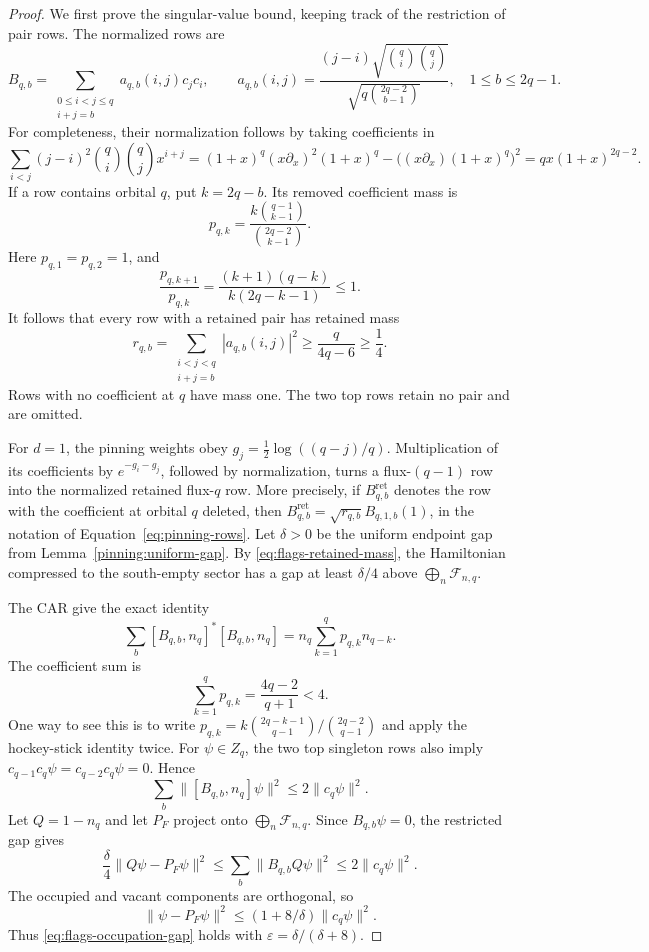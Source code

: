 \begin{proof}
We first prove the singular-value bound, keeping track of the restriction
of pair rows.  The normalized rows are
\[
 B_{q,b}=\sum_{\substack{0\leq i<j\leq q\\i+j=b}}
 a_{q,b}(i,j)c_jc_i,\qquad
 a_{q,b}(i,j)=
 \frac{(j-i)\sqrt{\binom qi\binom qj}}
 {\sqrt{q\binom{2q-2}{b-1}}},\quad 1\leq b\leq2q-1.
\]
For completeness, their normalization follows by taking coefficients in
\[
 \sum_{i<j}(j-i)^2\binom qi\binom qj x^{i+j}
 =(1+x)^q(x\partial_x)^2(1+x)^q
  -\bigl((x\partial_x)(1+x)^q\bigr)^2
 =qx(1+x)^{2q-2}.
\]
If a row contains orbital $q$, put $k=2q-b$.  Its removed coefficient
mass is
\[
 p_{q,k}=\frac{k\binom{q-1}{k-1}}{\binom{2q-2}{k-1}}.
\]
Here $p_{q,1}=p_{q,2}=1$, and
\[
 \frac{p_{q,k+1}}{p_{q,k}}
 =\frac{(k+1)(q-k)}{k(2q-k-1)}\leq1.
\]
It follows that every row with a retained pair has retained mass
\begin{equation}
 r_{q,b}=\sum_{\substack{i<j<q\\i+j=b}}|a_{q,b}(i,j)|^2
 \geq\frac{q}{4q-6}\geq\frac14.
 \label{eq:flags-retained-mass}
\end{equation}
Rows with no coefficient at $q$ have mass one.  The two top rows retain
no pair and are omitted.

For $d=1$, the pinning weights obey
$g_j=\tfrac12\log((q-j)/q)$.  Multiplication of its coefficients by
$e^{-g_i-g_j}$, followed by normalization, turns a flux-$(q-1)$ row into
the normalized retained flux-$q$ row.  More precisely, if
$B_{q,b}^{\mathrm{ret}}$ denotes the row with the coefficient at orbital
$q$ deleted, then
$B_{q,b}^{\mathrm{ret}}=\sqrt{r_{q,b}}B_{q,1,b}(1)$, in the notation
of Equation~\eqref{eq:pinning-rows}.  Let $\delta>0$ be the uniform
endpoint gap from Lemma~\ref{pinning:uniform-gap}.  By
\eqref{eq:flags-retained-mass}, the Hamiltonian compressed to the
south-empty sector has a gap at least $\delta/4$ above
$\bigoplus_n\mathcal F_{n,q}$.

The CAR give the exact identity
\[
 \sum_b[B_{q,b},n_q]^*[B_{q,b},n_q]
 =n_q\sum_{k=1}^{q}p_{q,k}n_{q-k}.
\]
The coefficient sum is
\[
 \sum_{k=1}^{q}p_{q,k}=\frac{4q-2}{q+1}<4.
\]
One way to see this is to write
$p_{q,k}=k\binom{2q-k-1}{q-1}/\binom{2q-2}{q-1}$ and apply the
hockey-stick identity twice.  For $\psi\in Z_q$, the two top singleton
rows also imply $c_{q-1}c_q\psi=c_{q-2}c_q\psi=0$.  Hence
\begin{equation}
 \sum_b\|[B_{q,b},n_q]\psi\|^2
 \leq2\|c_q\psi\|^2.
 \label{eq:flags-emptying-energy}
\end{equation}
Let $Q=1-n_q$ and let $P_F$ project onto
$\bigoplus_n\mathcal F_{n,q}$.  Since
$B_{q,b}\psi=0$, the restricted gap gives
\[
 \frac\delta4\|Q\psi-P_F\psi\|^2
 \leq\sum_b\|B_{q,b}Q\psi\|^2
 \leq2\|c_q\psi\|^2.
\]
The occupied and vacant components are orthogonal, so
\[
 \|\psi-P_F\psi\|^2
 \leq(1+8/\delta)\|c_q\psi\|^2.
\]
Thus \eqref{eq:flags-occupation-gap} holds with
$\varepsilon=\delta/(\delta+8)$.


\end{proof}

